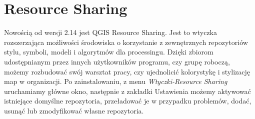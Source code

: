 \documentclass[12pt,a4paper]{book}
\begin{document}
\section{Resource Sharing}
Nowością od wersji 2.14 jest QGIS Resource Sharing. Jest to wtyczka rozszerzająca możliwości środowiska o korzystanie z zewnętrznych repozytoriów stylu, symboli, modeli i algorytmów dla processingu.  Dzięki zbiorom udostępnianym przez innych użytkowników programu, czy grupę roboczą, możemy rozbudować swój warsztat pracy, czy ujednolicić kolorystykę i stylizację map w organizacji. Po zainstalowaniu, z menu \textit{Wtyczki-Resource Sharing }uruchamiamy główne okno, następnie z zakładki Ustawienia możemy aktywować istniejące domyślne repozytoria, przeładować je w przypadku problemów, dodać, usunąć lub zmodyfikować własne repozytoria. 
\end{document}
